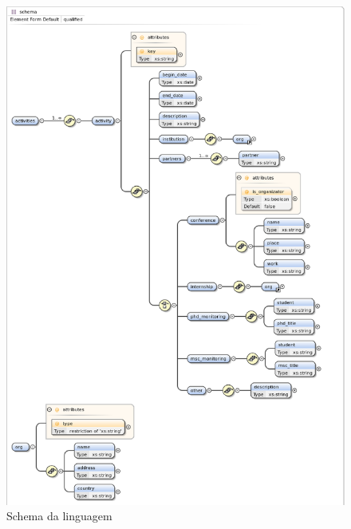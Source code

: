 \documentclass[a4paper,11pt,openright,openbib]{article}
\begin{document}
\begin{figure}[!ht]
\centering
\includegraphics[scale=0.75]{cv_activities_schema.eps}
\caption{Schema da linguagem}
\label{fig:cv_activities}
\end{figure}
\end{document}
